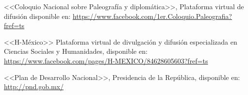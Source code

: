\begin{sloppypar}
<<Coloquio Nacional sobre
Paleografía y diplomática>>, Plataforma virtual de difusión disponible en:
\url{https://www.facebook.com/1er.Coloquio.Paleografia?fref=ts}
\end{sloppypar}


<<H-México>> Plataforma virtual de divulgación y difusión especializada en
Ciencias Sociales y Humanidades, disponible en:
\url{https://www.facebook.com/pages/H-MEXICO/84628605603?fref=ts}


<<Plan de Desarrollo Nacional>>, Presidencia de la República, disponible en:
\url{http://pnd.gob.mx/}
\newpage
\thispagestyle{empty}
\phantom{abc}
